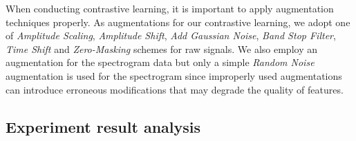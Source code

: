 When conducting contrastive learning, it is important to apply augmentation techniques properly.  As augmentations for our contrastive learning, we adopt one of \emph{Amplitude Scaling}, \emph{Amplitude Shift}, \emph{Add Gaussian Noise}, \emph{Band Stop Filter}, \emph{Time Shift} and \emph{Zero-Masking} schemes for raw signals. 
We also employ an augmentation for the spectrogram data but only a simple \emph{Random Noise} augmentation is used for the spectrogram since improperly used augmentations can introduce erroneous modifications that may degrade the quality of features.


\subsection{Experiment result analysis} %
%
%
